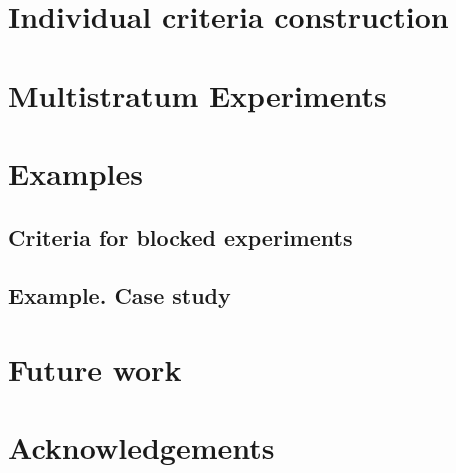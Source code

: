 \documentclass[11pt]{article}
\begin{document}
\section{Individual criteria construction}
\label{ch::compound_criteria}


\section{Multistratum Experiments}
\label{seq::ms_experiments}


\section{Examples}
\label{ch::compound_examples}


\subsection{Criteria for blocked experiments}
\label{subsec::compound_blocked}


\subsection{Example. Case study}
\label{subsec::case_study}



\section{Future work}


\section{Acknowledgements}

\cleardoublepage
{}
{} 
%


\end{document}
